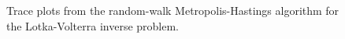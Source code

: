 \documentclass[11pt,a4paper]{report}
\begin{document}
\begin{figure}[h]
\centering
{}
\caption{Trace plots from the random-walk Metropolis-Hastings algorithm for the Lotka-Volterra inverse problem.
\label{fig:lotka-volterra:trace-plots}}
\end{figure}
\end{document}
